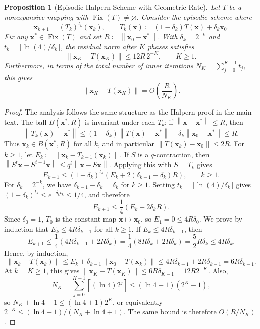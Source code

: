 \documentclass[letterpaper,11pt]{article}
\newcommand{\norm}[1]{\left\| #1 \right\|}
\newcommand{\vect}[1]{\mathbf{#1}}
\newtheorem{proposition}{Proposition}
\begin{document}
\begin{proposition}[Episodic Halpern Scheme with Geometric Rate]\label{prop:episodic_halpern}
Let \(T\) be a nonexpansive mapping with \(\operatorname{Fix}(T) \ne \varnothing\). Consider the episodic scheme where
\[
    \vect{x}_{k+1} = (T_k)^{t_k}(\vect{x}_k),
    \qquad
    T_k(\vect{x}) \coloneqq (1-\delta_k) T(\vect{x}) + \delta_k \vect{x}_0.
\]
Fix any \(\vect{x}^*\in\operatorname{Fix}(T)\) and set \(R\coloneqq\norm{\vect{x}_0-\vect{x}^*}\). With \(\delta_k = 2^{-k}\) and \(t_k = \lceil \ln(4)/\delta_k \rceil\), the residual norm after \(K\) phases satisfies
\[
    \norm{\vect{x}_K - T(\vect{x}_K)} \le 12R\,2^{-K},
    \qquad K\ge1.
\]
Furthermore, in terms of the total number of inner iterations \(N_K = \sum_{j=0}^{K-1} t_j\), this gives
\[
    \norm{\vect{x}_K - T(\vect{x}_K)} = O\left(\frac{R}{N_K}\right).
\]
\end{proposition}

\begin{proof}
The analysis follows the same structure as the Halpern proof in the main text. The ball \(B(\vect{x}^*,R)\) is invariant under each \(T_k\): if \(\norm{\vect{x}-\vect{x}^*}\le R\), then
\[
\norm{T_k(\vect{x})-\vect{x}^*}
\le
(1-\delta_k)\norm{T(\vect{x})-\vect{x}^*}
+\delta_k\norm{\vect{x}_0-\vect{x}^*}
\le R.
\]
Thus \(\vect{x}_k\in B(\vect{x}^*,R)\) for all \(k\), and in particular \(\norm{T(\vect{x}_k)-\vect{x}_0}\le2R\). For \(k\ge1\), let \(E_k \coloneqq \norm{\vect{x}_k - T_{k-1}(\vect{x}_k)}\). If \(S\) is a \(q\)-contraction, then \(\norm{S^t\vect{x}-S^{t+1}\vect{x}}\le q^t\norm{\vect{x}-S\vect{x}}\). Applying this with \(S=T_k\) gives
\[
    E_{k+1} \le (1-\delta_k)^{t_k} \left(E_k + 2(\delta_{k-1} - \delta_k)R\right),
    \qquad k\ge1.
\]
For \(\delta_k = 2^{-k}\), we have \(\delta_{k-1} - \delta_k = \delta_k\) for \(k \ge 1\). Setting \(t_k = \lceil \ln(4)/\delta_k \rceil\) gives \((1-\delta_k)^{t_k} \le e^{-\delta_k t_k} \le 1/4\), and therefore
\[
    E_{k+1} \le \frac{1}{4}(E_k + 2\delta_k R).
\]
Since \(\delta_0=1\), \(T_0\) is the constant map \(\vect{x}\mapsto \vect{x}_0\), so \(E_1=0\le 4R\delta_0\). We prove by induction that \(E_k\le 4R\delta_{k-1}\) for all \(k\ge1\). If \(E_{k} \le 4R\delta_{k-1}\), then
\[
    E_{k+1} \le \frac{1}{4}(4R\delta_{k-1} + 2R\delta_k)
    = \frac{1}{4}(8R\delta_k + 2R\delta_k)
    = \frac{5}{2}R\delta_k \le 4R\delta_k.
\]
Hence, by induction,
\[
    \norm{\vect{x}_k - T(\vect{x}_k)}
    \le E_k + \delta_{k-1}\norm{\vect{x}_0 - T(\vect{x}_k)}
    \le 4R\delta_{k-1} + 2R\delta_{k-1}
    = 6R\delta_{k-1}.
\]
At \(k=K\ge1\), this gives \(\norm{\vect{x}_K - T(\vect{x}_K)}\le 6R\delta_{K-1}=12R2^{-K}\). Also,
\[
N_K=\sum_{j=0}^{K-1}\left\lceil (\ln 4)2^j\right\rceil
\le (\ln4+1)(2^K-1),
\]
so \(N_K+\ln4+1\le(\ln4+1)2^K\), or equivalently \(2^{-K}\le(\ln4+1)/(N_K+\ln4+1)\). The same bound is therefore \(O(R/N_K)\).
\end{proof}
\end{document}
